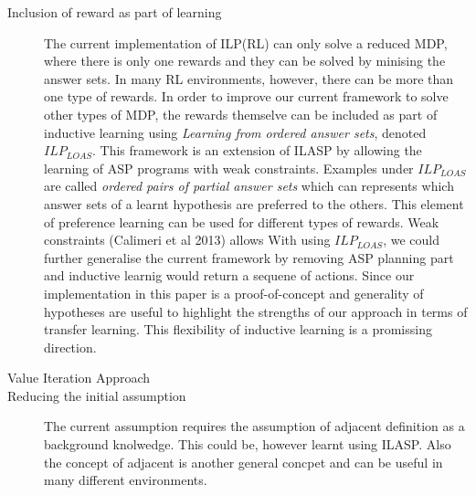 \begin{description}
    \item[Inclusion of reward as part of learning]
    The current implementation of ILP(RL) can only solve a reduced MDP, where there is only one rewards and they can be solved by minising the answer sets.
    In many RL environments, however, there can be more than one type of rewards. In order to improve our current framework to solve other types of MDP, 
    the rewards themselve can be included as part of inductive learning using \textit{Learning from ordered answer sets}, denoted $ILP_{LOAS}$. 
    This framework is an extension of ILASP by allowing the learning of ASP programs with weak constraints.
    Examples under $ILP_{LOAS}$ are called \textit{ordered pairs of partial answer sets} which can represents which answer sets of a learnt hypothesis are preferred to the others.
    This element of preference learning can be used for different types of rewards. 
    Weak constraints (Calimeri et al 2013) allows 
    With using $ILP_{LOAS}$, we could further generalise the current framework by removing ASP planning part and inductive learnig would return a sequene of actions. 
    Since our implementation in this paper is a proof-of-concept and generality of hypotheses are useful to highlight the strengths of our approach in terms of transfer learning.
    This flexibility of inductive learning is a promissing direction.
    \item[Value Iteration Approach]
    \item[Reducing the initial assumption]
    The current assumption requires the assumption of adjacent definition as a background knolwedge. This could be, however learnt using ILASP.
    Also the concept of adjacent is another general concpet and can be useful in many different environments.
\end{description}
